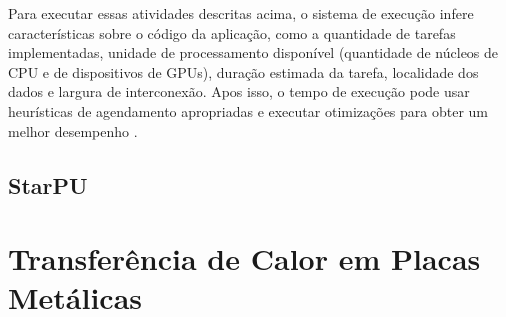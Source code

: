 Para executar essas atividades descritas acima, o sistema de execução infere características sobre o código da aplicação, como a quantidade de tarefas implementadas, unidade de processamento disponível (quantidade de núcleos de CPU e de dispositivos de GPUs), duração estimada da tarefa, localidade dos dados e largura de interconexão.
Apos isso, o tempo de execução pode usar heurísticas de agendamento apropriadas e executar otimizações para obter um melhor desempenho \cite{pinto2017visual}.

\subsection{StarPU}

\section{Transferência de Calor em Placas Metálicas}
